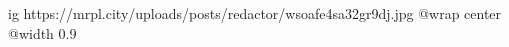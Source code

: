  
 
 
 
 

\ifcmt
  ig https://mrpl.city/uploads/posts/redactor/wsoafe4sa32gr9dj.jpg
  @wrap center
  @width 0.9
\fi
